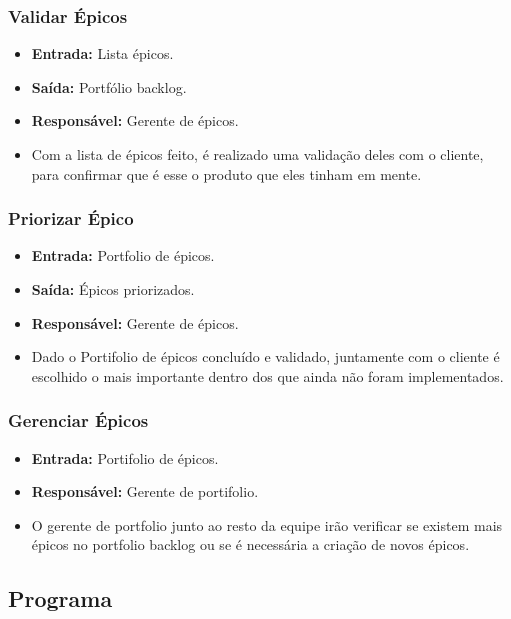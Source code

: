 \subsubsection{Validar Épicos}
  \begin{itemize}
    \item \textbf{Entrada:} Lista épicos.
    \item \textbf{Saída:} Portfólio backlog.
    \item \textbf{Responsável:} Gerente de épicos.
    \item Com a lista de épicos feito, é realizado uma validação deles com o cliente, para confirmar que é esse o produto que eles
      tinham em mente.
  \end{itemize}

\subsubsection{Priorizar Épico}
  \begin{itemize}
    \item \textbf{Entrada:} Portfolio de épicos.
    \item \textbf{Saída:} Épicos priorizados.
    \item \textbf{Responsável:} Gerente de épicos.
    \item Dado o Portifolio de épicos concluído e validado, juntamente com o cliente é escolhido o mais importante dentro dos que
      ainda não foram implementados.
  \end{itemize}

\subsubsection{Gerenciar Épicos}
  \begin{itemize}
    \item \textbf{Entrada:} Portifolio de épicos.
    \item \textbf{Responsável:} Gerente de portifolio.
    \item O gerente de portfolio junto ao resto da equipe irão verificar se existem mais épicos no portfolio backlog ou se é
      necessária a criação de novos épicos.
  \end{itemize}

\subsection{\textbf{Programa}}

